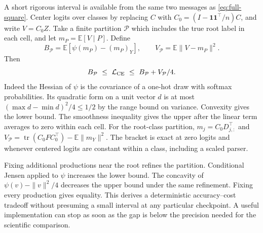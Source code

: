 A short rigorous interval is available from the same two messages as
\eqref{eq:full-square}. Center logits over classes by replacing $C$ with
$C_0=(I-\mathbf1\mathbf1^\top/n)C$, and write $V=C_0Z$.
Take a finite partition $\mathcal P$ which includes the true root label
in each cell, and let $m_P=\mathbb E[V\mid P]$. Define
\[
 B_{\mathcal P}=\mathbb E[\psi(m_P)-(m_P)_Y],\qquad
 V_{\mathcal P}=\mathbb E\|V-m_P\|^2 .
\]
Then
\begin{equation}
 B_{\mathcal P}\ \le\ \mathcal L_{\rm CE}\ \le\
 B_{\mathcal P}+V_{\mathcal P}/4 .
 \label{eq:ce-bracket}
\end{equation}
Indeed the Hessian of $\psi$ is the covariance of a one-hot draw with
softmax probabilities. Its quadratic form on a unit vector $d$ is at
most $(\max d-\min d)^2/4\le1/2$ by the range bound on variance.
Convexity gives the lower bound. The smoothness inequality gives the
upper after the linear term averages to zero within each cell.
For the root-class partition,
$m_j=C_0D_{j,:}^\top$ and
$V_{\mathcal P}=\operatorname{tr}(C_0 F C_0^\top)-\mathbb E\|m_Y\|^2$.
The bracket is exact at zero logits and whenever centered logits are constant
within a class, including a scaled parser.

Fixing additional productions near the root refines the partition.
Conditional Jensen applied to $\psi$ increases the lower bound.
The concavity of $\psi(v)-\|v\|^2/4$ decreases the upper bound under
the same refinement. Fixing every production gives equality. This derives
a deterministic accuracy--cost tradeoff without presuming a small interval
at any particular checkpoint. A useful implementation can stop as soon
as the gap is below the precision needed for the scientific comparison.
